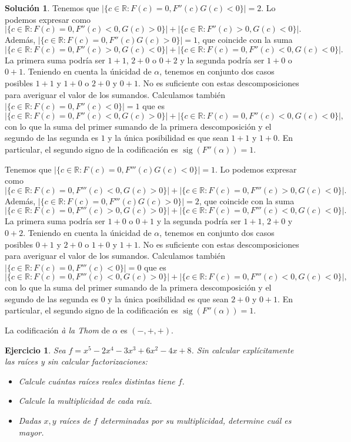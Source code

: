 \documentclass[10pt]{article}
\newtheorem{ejer}{Ejercicio}
\theoremstyle{definition}
\newtheorem*{sol}{Solución}
\newcommand{\RR}{\mathbb{R}}
\newcommand{\sig}{\operatorname{sig}}
\begin{document}
\begin{sol}
Tenemos que $|\{c\in\RR: F(c)=0, F''(c)G(c)<0\}|=2$. Lo podemos expresar como
\[|\{c\in\RR: F(c)=0, F''(c)<0, G(c)>0\}|+|\{c\in\RR: F''(c)>0, G(c)<0\}|.\]
Además, $|\{c\in\RR: F(c)=0, F''(c)G(c)>0\}|=1$, que coincide con la suma
\[|\{c\in\RR: F(c)=0, F''(c)>0, G(c)<0\}|+|\{c\in\RR: F(c)=0, F''(c)<0, G(c)<0\}|.\]
La primera suma podría ser $1+1$, $2+0$ o $0+2$ y la segunda podría ser $1+0$ o $0+1$. Teniendo en cuenta la únicidad de $\alpha$, tenemos en conjunto dos casos posibles $1+1$ y $1+0$ o $2+0$ y $0+1$. No es suficiente con estas descomposiciones para averiguar el valor de los sumandos. Calculamos también $|\{c\in\RR : F(c)=0, F''(c)<0\}|=1$ que es 
\[|\{c\in\RR : F(c)=0, F''(c)<0, G(c)>0\}|+|\{c\in\RR: F(c)=0, F''(c)<0, G(c)<0\}|,\]
con lo que la suma del primer sumando de la primera descomposición y el segundo de las segunda es $1$ y la única posibilidad es que sean $1+1$ y $1+0$. En particular, el segundo signo de la codificación es $\sig(F''(\alpha))=1$.

Tenemos que $|\{c\in\RR: F(c)=0, F'''(c)G(c)<0\}|=1$. Lo podemos expresar como
\[|\{c\in\RR: F(c)=0, F'''(c)<0, G(c)>0\}|+|\{c\in\RR: F(c)=0, F'''(c)>0, G(c)<0\}|.\]
Además, $|\{c\in\RR: F(c)=0, F'''(c)G(c)>0\}|=2$, que coincide con la suma
\[|\{c\in\RR: F(c)=0, F'''(c)>0, G(c)>0\}|+|\{c\in\RR: F(c)=0, F'''(c)<0, G(c)<0\}|.\]
La primera suma podría ser $1+0$ o $0+1$ y la segunda podría ser $1+1$, $2+0$ y $0+2$. Teniendo en cuenta la únicidad de $\alpha$, tenemos en conjunto dos casos posibles $0+1$ y $2+0$ o $1+0$ y $1+1$. No es suficiente con estas descomposiciones para averiguar el valor de los sumandos. Calculamos también $|\{c\in\RR : F(c)=0, F'''(c)<0\}|=0$ que es 
\[|\{c\in\RR : F(c)=0, F'''(c)<0, G(c)>0\}|+|\{c\in\RR: F(c)=0, F'''(c)<0, G(c)<0\}|,\]
con lo que la suma del primer sumando de la primera descomposición y el segundo de las segunda es $0$ y la única posibilidad es que sean $2+0$ y $0+1$. En particular, el segundo signo de la codificación es $\sig(F''(\alpha))=1$.

La codificación \textit{à la Thom} de $\alpha$ es $(-,+,+)$.

\end{sol}
\begin{ejer} Sea $f=x^5-2x^4-3x^3+6x^2-4x+8$. Sin calcular explícitamente las raíces y sin calcular factorizaciones:
\begin{itemize}
    \item Calcule cuántas raíces reales distintas tiene $f$.
    \item Calcule la multiplicidad de cada raíz.
    \item Dadas $x,y$ raíces de $f$ determinadas por su multiplicidad, determine cuál es mayor.
\end{itemize}
\end{ejer}
\end{document}
